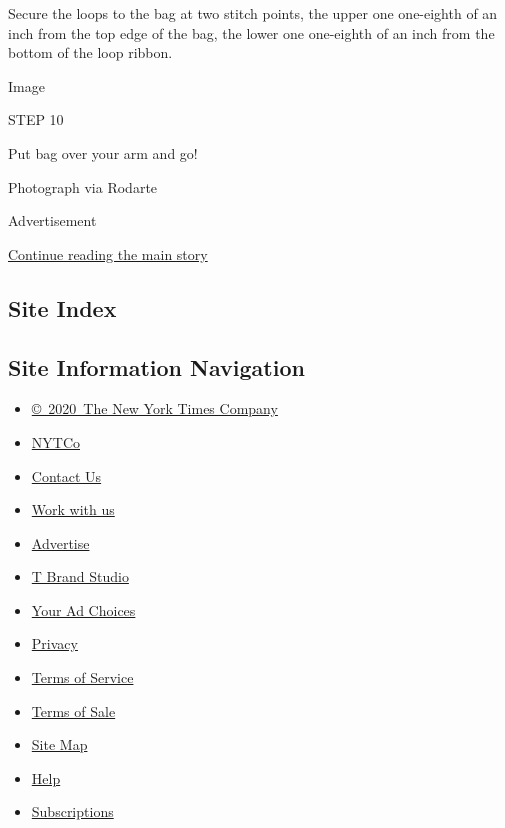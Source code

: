 Secure the loops to the bag at two stitch points, the upper one
one-eighth of an inch from the top edge of the bag, the lower one
one-eighth of an inch from the bottom of the loop ribbon.

Image

STEP 10

Put bag over your arm and go!

Photograph via Rodarte

Advertisement

\protect\hyperlink{after-bottom}{Continue reading the main story}

\hypertarget{site-index}{%
\subsection{Site Index}\label{site-index}}

\hypertarget{site-information-navigation}{%
\subsection{Site Information
Navigation}\label{site-information-navigation}}

\begin{itemize}
\tightlist
\item
  \href{https://help.nytimes.com/hc/en-us/articles/115014792127-Copyright-notice}{©~2020~The
  New York Times Company}
\end{itemize}

\begin{itemize}
\tightlist
\item
  \href{https://www.nytco.com/}{NYTCo}
\item
  \href{https://help.nytimes.com/hc/en-us/articles/115015385887-Contact-Us}{Contact
  Us}
\item
  \href{https://www.nytco.com/careers/}{Work with us}
\item
  \href{https://nytmediakit.com/}{Advertise}
\item
  \href{http://www.tbrandstudio.com/}{T Brand Studio}
\item
  \href{https://www.nytimes.com/privacy/cookie-policy\#how-do-i-manage-trackers}{Your
  Ad Choices}
\item
  \href{https://www.nytimes.com/privacy}{Privacy}
\item
  \href{https://help.nytimes.com/hc/en-us/articles/115014893428-Terms-of-service}{Terms
  of Service}
\item
  \href{https://help.nytimes.com/hc/en-us/articles/115014893968-Terms-of-sale}{Terms
  of Sale}
\item
  \href{https://spiderbites.nytimes.com}{Site Map}
\item
  \href{https://help.nytimes.com/hc/en-us}{Help}
\item
  \href{https://www.nytimes.com/subscription?campaignId=37WXW}{Subscriptions}
\end{itemize}
